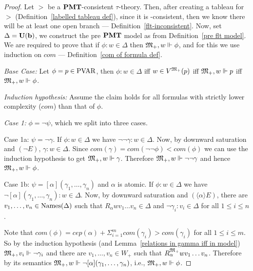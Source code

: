 \begin{proof}
    \par Let $\gt$ be a $\textbf{PMT}$-consistent $\tau$-theory. Then, after creating a tableau for $\gt$ (Definition~\ref{labelled tableau def}), since it is \pmt-consistent, then we know there will be at least one open branch  --- Definition~\ref{flt-inconsistent}. Now, set $\Delta=\textbf{U}(\textbf{b})$, we construct the pre $\textbf{PMT}$ model as from Definition~\ref{pre flt model}. We are required to prove that if $\phi:w\in\Delta$ then ${\mathfrak{M}_+},w\Vdash\phi$, and for this we use induction on $com$ --- Definition~\ref{com of formula def}.
    \par \textit{Base Case:} Let $\phi=p\in\text{PVAR}$, then $\phi:w\in\Delta$ iff $w\in V^{\mathfrak{M}_+}(p)$ iff ${\mathfrak{M}_+},w\Vdash p$ iff ${\mathfrak{M}_+},w\Vdash \phi$. 
    \par \textit{Induction hypothesis:} Assume the claim holds for all formulas with strictly lower complexity ($com$) than that of $\phi$.

    \par \textit{Case 1:} $\phi=\neg\psi$, which we split into three cases.

    \par Case 1a: $\psi=\neg\gamma$. If $\phi:w\in\Delta$ we have $\neg\neg\gamma:w\in\Delta$. Now, by downward saturation and $(\neg E)$, $\gamma:w\in\Delta$. Since $com(\gamma) = com(\neg\neg\phi) <com(\phi)$ we can use the induction hypothesis to get $ {\mathfrak{M}_+},w\Vdash\gamma$. Therefore ${\mathfrak{M}_+},w\Vdash\neg\neg\gamma$ and hence ${\mathfrak{M}_+},w\Vdash\phi$.

    \par Case 1b: $\psi=[\alpha](\gamma_1,\ldots,\gamma_n)$ and $\alpha$ is atomic. If $\phi:w\in\Delta$ we have $\neg[\alpha](\gamma_1,\ldots,\gamma_n):w\in\Delta$. Now, by downward saturation and $(\langle \alpha\rangle E)$, there are $v_1,\ldots,v_n\in \text{Names}(\Delta)$ such that $R_\alpha wv_1\ldots v_n \in\Delta$ and $\neg\gamma_i:v_i\in\Delta$ for all $1\leq i\leq n$.
    \par Note that $com(\phi) = cep(\alpha) + \Sigma_{i=1}^m com(\gamma_i) > com(\gamma_i)$ for all $1\leq i\leq m$.
    So by the induction hypothesis (and Lemma~\ref{relations in gamma iff in model}) ${\mathfrak{M}_+},v_i\Vdash \neg\gamma_i$ and there are $v_1,\ldots, v_n\in W_+$ such that $R^{{\mathfrak{M}_+}}_\alpha wv_1\ldots v_n$. Therefore by its semantics ${\mathfrak{M}_+},w\Vdash \neg[\alpha](\gamma_1,\ldots,\gamma_n)$, i.e., ${\mathfrak{M}_+},w\Vdash\phi$. 


\end{proof}
